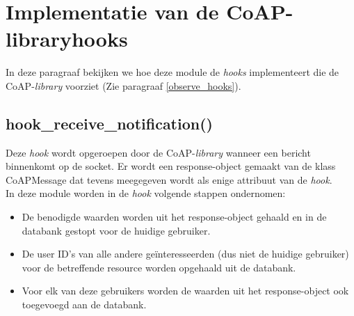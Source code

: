 
\section{Implementatie van de CoAP-libraryhooks}
In deze paragraaf bekijken we hoe deze module de \textit{hooks} implementeert die de CoAP-\textit{library} voorziet (Zie paragraaf \ref{observe_hooks}).

\subsection{hook\_receive\_notification()}
Deze \textit{hook} wordt opgeroepen door de CoAP-\textit{library} wanneer een bericht binnenkomt op de socket. Er wordt een response-object gemaakt van de klass CoAPMessage dat tevens meegegeven wordt als enige attribuut van de \textit{hook}.\\
In deze module worden in de \textit{hook} volgende stappen ondernomen:
\begin{itemize}
\item De benodigde waarden worden uit het response-object gehaald en in de databank gestopt voor de huidige gebruiker.
\item De user ID's van alle andere ge\"{i}nteresseerden (dus niet de huidige gebruiker) voor de betreffende resource worden opgehaald uit de databank.
\item Voor elk van deze gebruikers worden de waarden uit het response-object ook toegevoegd aan de databank.
\end{itemize}


